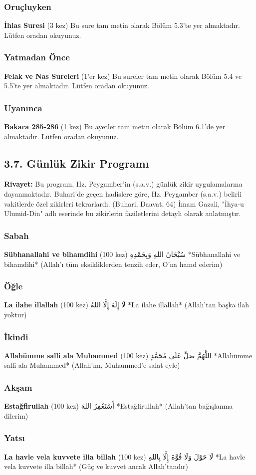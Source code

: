 \documentclass[12pt,a4paper]{article}
\begin{document}
\subsubsection{Oruçluyken}
\textbf{İhlas Suresi} (3 kez)
Bu sure tam metin olarak Bölüm 5.3'te yer almaktadır. Lütfen oradan okuyunuz.
\subsubsection{Yatmadan Önce}
\textbf{Felak ve Nas Sureleri} (1'er kez)
Bu sureler tam metin olarak Bölüm 5.4 ve 5.5'te yer almaktadır. Lütfen oradan okuyunuz.
\subsubsection{Uyanınca}
\textbf{Bakara 285-286} (1 kez)
Bu ayetler tam metin olarak Bölüm 6.1'de yer almaktadır. Lütfen oradan okuyunuz.
\subsection{3.7. Günlük Zikir Programı}
\textbf{Rivayet:} Bu program, Hz. Peygamber'in (s.a.v.) günlük zikir uygulamalarına dayanmaktadır. Buhari'de geçen hadislere göre, Hz. Peygamber (s.a.v.) belirli vakitlerde özel zikirleri tekrarlardı. (Buhari, Daavat, 64) İmam Gazali, "İhya-u Ulumid-Din" adlı eserinde bu zikirlerin faziletlerini detaylı olarak anlatmıştır.
\subsubsection{Sabah}
\textbf{Sübhanallahi ve bihamdihi} (100 kez)
سُبْحَانَ اللهِ وَبِحَمْدِهِ
*Sübhanallahi ve bihamdihi*
(Allah'ı tüm eksikliklerden tenzih eder, O'na hamd ederim)
\subsubsection{Öğle}
\textbf{La ilahe illallah} (100 kez)
لَا إِلَهَ إِلَّا اللهُ
*La ilahe illallah*
(Allah'tan başka ilah yoktur)
\subsubsection{İkindi}
\textbf{Allahümme salli ala Muhammed} (100 kez)
اللَّهُمَّ صَلِّ عَلَى مُحَمَّدٍ
*Allahümme salli ala Muhammed*
(Allah'ım, Muhammed'e salat eyle)
\subsubsection{Akşam}
\textbf{Estağfirullah} (100 kez)
أَسْتَغْفِرُ اللهَ
*Estağfirullah*
(Allah'tan bağışlanma dilerim)
\subsubsection{Yatsı}
\textbf{La havle vela kuvvete illa billah} (100 kez)
لَا حَوْلَ وَلَا قُوَّةَ إِلَّا بِاللهِ
*La havle vela kuvvete illa billah*
(Güç ve kuvvet ancak Allah'tandır)
\end{document}
